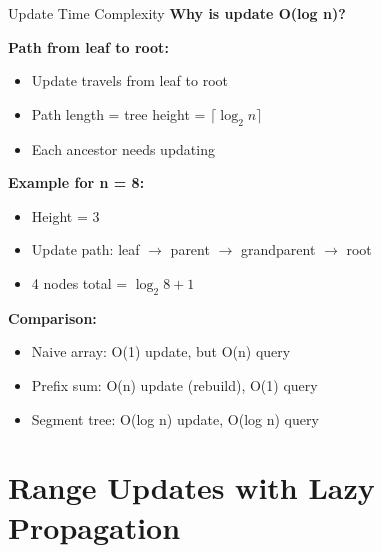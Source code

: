 \documentclass[aspectratio=169]{beamer}
\begin{document}
\begin{frame}{Update Time Complexity}
  \textbf{Why is update O(log n)?}

  \vspace{0.5cm}
  \textbf{Path from leaf to root:}
  \begin{itemize}
    \item Update travels from leaf to root
    \item Path length = tree height = $\lceil \log_2 n \rceil$
    \item Each ancestor needs updating
  \end{itemize}

  \vspace{0.5cm}
  \textbf{Example for n = 8:}
  \begin{itemize}
    \item Height = 3
    \item Update path: leaf $\rightarrow$ parent $\rightarrow$ grandparent $\rightarrow$ root
    \item 4 nodes total = $\log_2 8 + 1$
  \end{itemize}

  \vspace{0.5cm}
  \textbf{Comparison:}
  \begin{itemize}
    \item Naive array: O(1) update, but O(n) query
    \item Prefix sum: O(n) update (rebuild), O(1) query
    \item Segment tree: O(log n) update, O(log n) query \checkmark
  \end{itemize}
\end{frame}

\section{Range Updates with Lazy Propagation}
\end{document}
